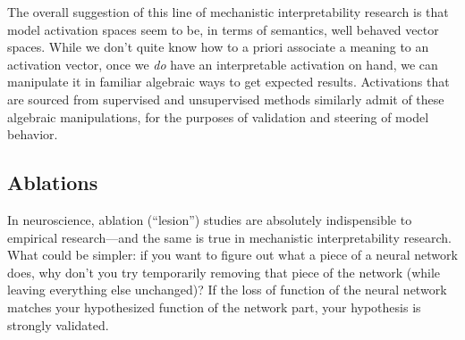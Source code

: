 The overall suggestion of this line of mechanistic interpretability research is
that model activation spaces seem to be, in terms of semantics, well behaved
vector spaces. While we don't quite know how to a priori associate a meaning to
an activation vector, once we \emph{do} have an interpretable activation on hand,
we can manipulate it in familiar algebraic ways to get expected results.
Activations that are sourced from supervised and unsupervised methods similarly
admit of these algebraic manipulations, for the purposes of validation and
steering of model behavior.


\subsection{Ablations}
In neuroscience, ablation (``lesion'') studies are absolutely indispensible to
empirical research---and the same is true in mechanistic interpretability
research. What could be simpler: if you want to figure out what a piece of a
neural network does, why don't you try temporarily removing that piece of the
network (while leaving everything else unchanged)? If the loss of function of
the neural network matches your hypothesized function of the network part, your
hypothesis is strongly validated.

